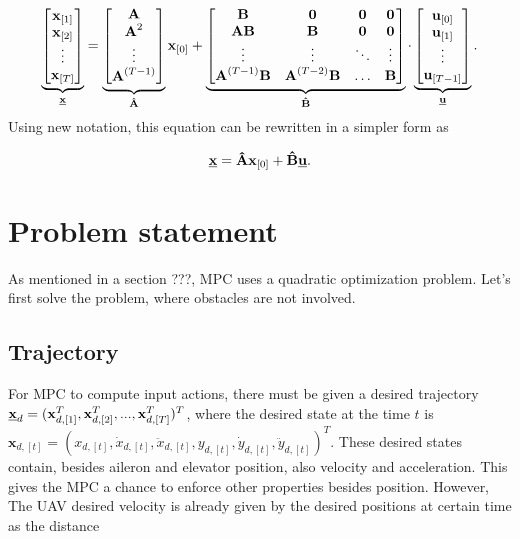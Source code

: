\documentclass[a4paper,11pt,titlepage]{article}
\newcommand{\uvec}{\textbf{\underline{u}}}
\begin{document}
\begin{equation}
\label{eq:prediction_big}
\underbrace{
\begin{bmatrix}
\textbf{x}_{[1]} \\
\textbf{x}_{[2]} \\
\vdots \\
\textbf{x}_{[T]} \\
\end{bmatrix}}_{\textbf{\underline{x}}}
=
\underbrace{
\begin{bmatrix}
\textbf{A} \\
\textbf{A}^2 \\
\vdots \\
\textbf{A}^{(T-1)} \\
\end{bmatrix}}_{\textbf{\^A}}
\textbf{x}_{[0]}
+
\underbrace{
\begin{bmatrix}
\textbf{B} & \textbf{0} & \textbf{0} & \textbf{0} \\
\textbf{AB} & \textbf{B} & \textbf{0} & \textbf{0} \\
\vdots & \vdots & \ddots & \vdots \\
\textbf{A}^{(T-1)}\textbf{B} & \textbf{A}^{(T-2)}\textbf{B} & \hdots & \textbf{B}
\end{bmatrix}
}_{\textbf{\^B}}
\cdot
\underbrace{
\begin{bmatrix}
\textbf{u}_{[0]} \\
\textbf{u}_{[1]} \\
\vdots \\
\textbf{u}_{[T-1]} \\
\end{bmatrix}}_{\uvec}.
\end{equation}
Using new notation, this equation can be rewritten in a simpler form as

\begin{equation}
\label{eq:prediction_final}
\textbf{\underline{x}} = \textbf{\^A}\textbf{x}_{[0]} + \textbf{\^B}\uvec.
\end{equation}

\section{Problem statement}
As mentioned in a section ???, MPC uses a quadratic optimization problem. Let's first solve the problem, where obstacles are not involved. 
\subsection{Trajectory}
For MPC to compute input actions, there must be given a desired trajectory $\textbf{\underline{x}}_d = 
(\textbf{x}_{d,[1]}^T, \textbf{x}_{d,[2]}^T, ..., \textbf{x}_{d,[T]}^T)^T$, where the desired state at the time $t$ is $\textbf{x}_{d,[t]} = (x_{d,[t]}, \dot{x}_{d,[t]}, \ddot{x}_{d,[t]}, y_{d,[t]}, \dot{y}_{d,[t]}, \ddot{y}_{d,[t]})^T$. These desired states contain, besides aileron and elevator position, also velocity and acceleration. This gives the MPC a chance to  enforce other properties besides position. However, The UAV desired velocity is already given by the desired positions at certain time as the distance 
\end{document}
